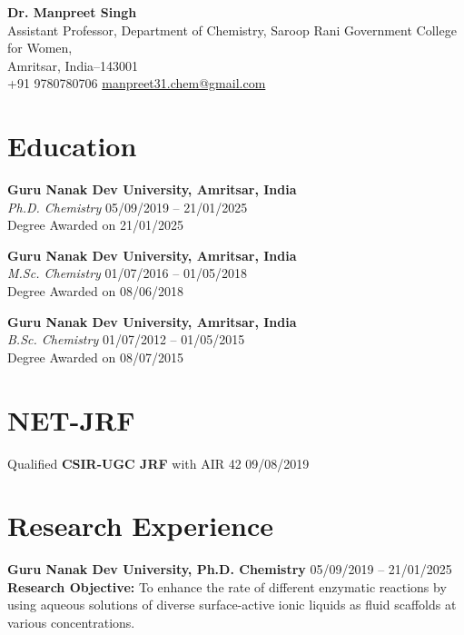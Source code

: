 \documentclass[11pt,a4paper]{article}
\begin{document}
\begin{center}
    {\LARGE\bfseries Dr. Manpreet Singh}\\[4pt]
    Assistant Professor, Department of Chemistry, Saroop Rani Government College for Women,\\
    Amritsar, India--143001\\
    +91 9780780706 \quad
    \href{mailto:manpreet31.chem@gmail.com}{manpreet31.chem@gmail.com}
\end{center}

\section*{Education}

\textbf{Guru Nanak Dev University, Amritsar, India}\\
\textit{Ph.D. Chemistry} \hfill 05/09/2019 -- 21/01/2025\\
Degree Awarded on 21/01/2025

\textbf{Guru Nanak Dev University, Amritsar, India}\\
\textit{M.Sc. Chemistry} \hfill 01/07/2016 -- 01/05/2018\\
Degree Awarded on 08/06/2018

\textbf{Guru Nanak Dev University, Amritsar, India}\\
\textit{B.Sc. Chemistry} \hfill 01/07/2012 -- 01/05/2015\\
Degree Awarded on 08/07/2015

\vspace{0.6cm}

\section*{NET-JRF}
Qualified \textbf{CSIR-UGC JRF} with AIR 42 \hfill 09/08/2019

\vspace{0.6cm}

\section*{Research Experience}

\textbf{Guru Nanak Dev University, Ph.D. Chemistry} \hfill 05/09/2019 -- 21/01/2025\\
\textbf{Research Objective:} To enhance the rate of different enzymatic reactions by using aqueous solutions of diverse surface-active ionic liquids as fluid scaffolds at various concentrations.
\end{document}
